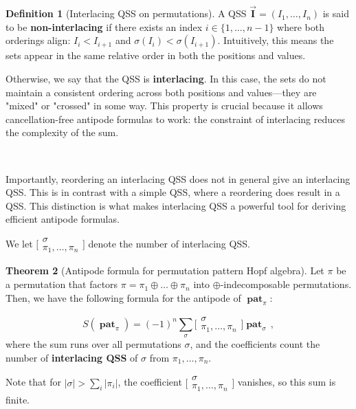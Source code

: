 \documentclass[12pt, reqno]{amsart}
\theoremstyle{definition}
\newtheorem{thm}{Theorem}[section]
\newtheorem{defin}[thm]{Definition}
\newcommand{\III}{\vec{\mathbf{I}}}
\DeclareMathOperator{\pat}{\mathbf{pat}}
\begin{document}
\begin{defin}[Interlacing QSS on permutations]
A QSS $\III = (I_1, \dots, I_n)$ is said to be \textbf{non-interlacing} if there exists an index $i \in \{1, \dots, n-1\}$ where both orderings align: $I_i < I_{i+1}$ and $\sigma(I_i) < \sigma(I_{i+1})$. Intuitively, this means the sets appear in the same relative order in both the positions and values.

Otherwise, we say that the QSS is \textbf{interlacing}. In this case, the sets do not maintain a consistent ordering across both positions and values—they are "mixed" or "crossed" in some way. This property is crucial because it allows cancellation-free antipode formulas to work: the constraint of interlacing reduces the complexity of the sum.

\

Importantly, reordering an interlacing QSS does not in general give an interlacing QSS. This is in contrast with a simple QSS, where a reordering does result in a QSS. This distinction is what makes interlacing QSS a powerful tool for deriving efficient antipode formulas.

We let $\bigl[\!\begin{smallmatrix} \sigma \\ \pi_1, \dots, \pi_n \end{smallmatrix}\!\bigr]$ denote the number of interlacing QSS.
\end{defin}


\begin{thm}[Antipode formula for permutation pattern Hopf algebra]\label{thm:antipode_perms_intro}
Let $\pi$ be a permutation that factors $\pi = \pi_1\oplus \dots \oplus \pi_n$ into $\oplus$-indecomposable permutations.
Then, we have the following formula for the antipode of $\pat_{\pi}$:

$$S(\pat_{\pi}) = (-1)^n \sum_{\sigma} \bigl[\!\begin{smallmatrix} \sigma \\ \pi_1, \dots, \pi_n \end{smallmatrix}\!\bigr] \pat_{\sigma}\, ,$$
where the sum runs over all permutations $\sigma$, and the coefficients count the number of \textbf{interlacing QSS} of $\sigma$ from $\pi_1, \dots, \pi_n$.
\end{thm}

Note that for $|\sigma| > \sum_i |\pi_i|$, the coefficient $\bigl[\!\begin{smallmatrix} \sigma \\ \pi_1, \dots, \pi_n \end{smallmatrix}\!\bigr]$ vanishes, so this sum is finite.
\end{document}

